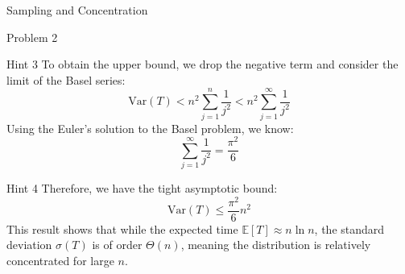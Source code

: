 \documentclass{beamer}
\begin{document}
\begin{section}{Sampling and Concentration}
\begin{subsection}{Problem 2}
    \begin{frame}
        \begin{block}{Hint 3}
            To obtain the upper bound, we drop the negative term and consider the limit of the Basel series:
            \[
                \text{Var}(T) < n^2 \sum_{j=1}^n \frac{1}{j^2} < n^2 \sum_{j=1}^{\infty} \frac{1}{j^2}
            \]
            Using the Euler's solution to the Basel problem, we know:
            \[
                \sum_{j=1}^{\infty} \frac{1}{j^2} = \frac{\pi^2}{6}
            \]
        \end{block}
    \end{frame}
    
    \begin{frame}
        \begin{block}{Hint 4}
            Therefore, we have the tight asymptotic bound:
            \[
                \text{Var}(T) \le \frac{\pi^2}{6} n^2
            \]
            This result shows that while the expected time $\mathbb{E}[T] \approx n \ln n$, the standard deviation $\sigma(T)$ is of order $\Theta(n)$, meaning the distribution is relatively concentrated for large $n$.
        \end{block}
    \end{frame}
\end{subsection}

\end{section}
\end{document}
